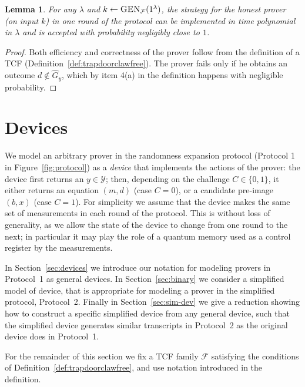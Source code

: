 \documentclass[11pt]{article}
\newtheorem{lemma}[theorem]{Lemma}
\theoremstyle{remark}
\theoremstyle{definition}
\newcommand{\mY}{\ensuremath{\mathcal{Y}}}
\newcommand{\GEN}{\ensuremath{\textsc{GEN}}}
\newcommand{\dset}{G}
\begin{document}
\begin{lemma}\label{lem:completeness}
For any $\lambda$ and $k\leftarrow\GEN_{\mathcal{F}}(1^\lambda)$, the strategy for the honest prover (on input $k$) in one round of the protocol can be implemented in time polynomial in $\lambda$ and is accepted with probability negligibly close to $1$.  
\end{lemma}

\begin{proof}
Both efficiency and correctness of the prover follow from the definition of a TCF (Definition~\ref{def:trapdoorclawfree}). The prover fails only if he obtains an outcome $d\notin \hat{\dset}_y$, which by item 4(a) in the definition happens with negligible probability.
\end{proof}


\section{Devices}
\label{sec:device}

We model an arbitrary prover in the randomness expansion protocol (Protocol 1 in Figure~\ref{fig:protocol}) as a \emph{device} that implements the actions of the prover: the device first returns an $y\in\mY$; then, depending on the challenge $C\in\{0,1\}$, it either returns an equation $(m,d)$ (case $C=0$), or a candidate pre-image $(b,x)$ (case $C=1$). For simplicity we assume that the device makes the same set of measurements in each round of the protocol. This is without loss of generality, as we allow the state of the device to change from one round to the next; in particular it may play the role of a quantum memory used as a control register by the measurements. 

In Section~\ref{sec:devices} we introduce our notation for modeling provers in Protocol~1 as general devices. In Section~\ref{sec:binary} we consider a simplified model of device, that is appropriate for modeling a prover in the simplified protocol, Protocol~2. Finally in Section~\ref{sec:sim-dev} we give a reduction showing how to construct a specific simplified device from any general device, such that the simplified device generates similar transcripts in Protocol~2 as the original device does in Protocol~1. 

For the remainder of this section we fix a TCF family $\mathcal{F}$ satisfying the conditions of Definition~\ref{def:trapdoorclawfree}, and use notation introduced in the definition. 
\end{document}
